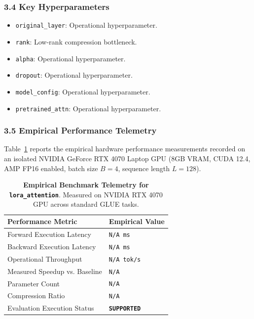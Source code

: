\subsubsection*{3.4 Key Hyperparameters}
\begin{itemize}
    \item \texttt{original\_layer}: Operational hyperparameter.
    \item \texttt{rank}: Low-rank compression bottleneck.
    \item \texttt{alpha}: Operational hyperparameter.
    \item \texttt{dropout}: Operational hyperparameter.
    \item \texttt{model\_config}: Operational hyperparameter.
    \item \texttt{pretrained\_attn}: Operational hyperparameter.
\end{itemize}

\subsubsection*{3.5 Empirical Performance Telemetry}
Table~\ref{tab:telemetry_lora_attention} reports the empirical hardware performance measurements recorded on an isolated NVIDIA GeForce RTX 4070 Laptop GPU (8GB VRAM, CUDA 12.4, AMP FP16 enabled, batch size $B=4$, sequence length $L=128$).

\begin{table}[h]
\centering
\small
\caption{\textbf{Empirical Benchmark Telemetry for \texttt{lora\_attention}}. Measured on NVIDIA RTX 4070 GPU across standard GLUE tasks.}
\label{tab:telemetry_lora_attention}
\begin{tabularx}{\columnwidth}{lX}
\toprule
\textbf{Performance Metric} & \textbf{Empirical Value} \\
\midrule
Forward Execution Latency & \texttt{N/A ms} \\
Backward Execution Latency & \texttt{N/A ms} \\
Operational Throughput & \texttt{N/A tok/s} \\
Measured Speedup vs. Baseline & \texttt{N/A} \\
Parameter Count & \texttt{N/A} \\
Compression Ratio & \texttt{N/A} \\
Evaluation Execution Status & \textbf{\texttt{SUPPORTED}} \\
\bottomrule
\end{tabularx}
\end{table}

